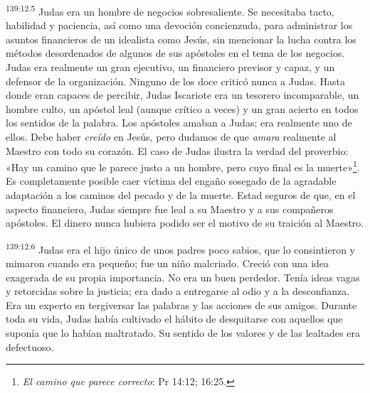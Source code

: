 \par 
\textsuperscript{139:12.5} Judas era un hombre de negocios sobresaliente. Se necesitaba tacto, habilidad y paciencia, así como una devoción concienzuda, para administrar los asuntos financieros de un idealista como Jesús, sin mencionar la lucha contra los métodos desordenados de algunos de sus apóstoles en el tema de los negocios. Judas era realmente un gran ejecutivo, un financiero previsor y capaz, y un defensor de la organización. Ninguno de los doce criticó nunca a Judas. Hasta donde eran capaces de percibir, Judas Iscariote era un tesorero incomparable, un hombre culto, un apóstol leal (aunque crítico a veces) y un gran acierto en todos los sentidos de la palabra. Los apóstoles amaban a Judas; era realmente uno de ellos. Debe haber \textit{creído} en Jesús, pero dudamos de que \textit{amara} realmente al Maestro con todo su corazón. El caso de Judas ilustra la verdad del proverbio: «Hay un camino que le parece justo a un hombre, pero cuyo final es la muerte»\footnote{\textit{El camino que parece correcto}: Pr 14:12; 16:25.}. Es completamente posible caer víctima del engaño sosegado de la agradable adaptación a los caminos del pecado y de la muerte. Estad seguros de que, en el aspecto financiero, Judas siempre fue leal a su Maestro y a sus compañeros apóstoles. El dinero nunca hubiera podido ser el motivo de su traición al Maestro.

\par 
\textsuperscript{139:12.6} Judas era el hijo único de unos padres poco sabios, que lo consintieron y mimaron cuando era pequeño; fue un niño malcriado. Creció con una idea exagerada de su propia importancia. No era un buen perdedor. Tenía ideas vagas y retorcidas sobre la justicia; era dado a entregarse al odio y a la desconfianza. Era un experto en tergiversar las palabras y las acciones de sus amigos. Durante toda su vida, Judas había cultivado el hábito de desquitarse con aquellos que suponía que lo habían maltratado. Su sentido de los valores y de las lealtades era defectuoso.


